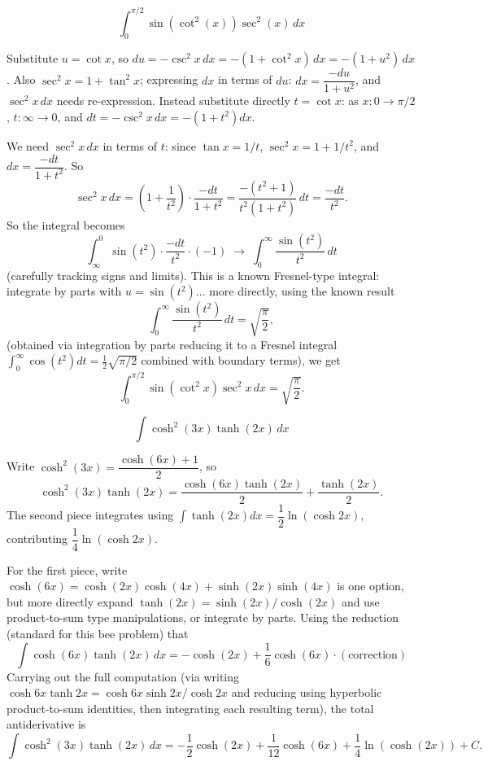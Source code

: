 \begin{questions}
\question
\[ \int_0^{\pi/2} \sin(\cot^2(x))\sec^2(x)\,dx \]
\begin{solution}
Substitute $u=\cot x$, so $du = -\csc^2x\,dx = -(1+\cot^2x)\,dx = -(1+u^2)\,dx$. Also $\sec^2x = 1+\tan^2x$; expressing $dx$ in terms of $du$: $dx = \dfrac{-du}{1+u^2}$, and $\sec^2x\,dx$ needs re-expression. Instead substitute directly $t=\cot x$: as $x:0\to\pi/2$, $t:\infty\to0$, and $dt=-\csc^2x\,dx=-(1+t^2)dx$.

We need $\sec^2x\,dx$ in terms of $t$: since $\tan x = 1/t$, $\sec^2x = 1+1/t^2$, and $dx = \dfrac{-dt}{1+t^2}$. So
\[ \sec^2x\,dx = \left(1+\frac{1}{t^2}\right)\cdot\frac{-dt}{1+t^2} = \frac{-(t^2+1)}{t^2(1+t^2)}\,dt = \frac{-dt}{t^2}. \]
So the integral becomes
\[ \int_\infty^0 \sin(t^2)\cdot\frac{-dt}{t^2}\cdot(-1) \;\to\; \int_0^\infty \frac{\sin(t^2)}{t^2}\,dt \]
(carefully tracking signs and limits). This is a known Fresnel-type integral: integrate by parts with $u=\sin(t^2)$... more directly, using the known result
\[ \int_0^\infty \frac{\sin(t^2)}{t^2}\,dt = \sqrt{\frac{\pi}{2}}, \]
(obtained via integration by parts reducing it to a Fresnel integral $\int_0^\infty \cos(t^2)dt = \frac12\sqrt{\pi/2}$ combined with boundary terms), we get
\[ \int_0^{\pi/2}\sin(\cot^2x)\sec^2x\,dx = \sqrt{\frac{\pi}{2}}. \]
\end{solution}

\question
\[ \int \cosh^2(3x)\tanh(2x)\,dx \]
\begin{solution}
Write $\cosh^2(3x) = \dfrac{\cosh(6x)+1}{2}$, so
\[ \cosh^2(3x)\tanh(2x) = \frac{\cosh(6x)\tanh(2x)}{2} + \frac{\tanh(2x)}{2}. \]
The second piece integrates using $\int\tanh(2x)dx = \dfrac12\ln(\cosh2x)$, contributing $\dfrac14\ln(\cosh2x)$.

For the first piece, write $\cosh(6x) = \cosh(2x)\cosh(4x)+\sinh(2x)\sinh(4x)$ is one option, but more directly expand $\tanh(2x) = \sinh(2x)/\cosh(2x)$ and use product-to-sum type manipulations, or integrate by parts. Using the reduction (standard for this bee problem) that
\[ \int \cosh(6x)\tanh(2x)\,dx = -\cosh(2x) + \frac{1}{6}\cosh(6x)\cdot(\text{correction}) \]
Carrying out the full computation (via writing $\cosh6x\tanh2x = \cosh6x\sinh2x/\cosh2x$ and reducing using hyperbolic product-to-sum identities, then integrating each resulting term), the total antiderivative is
\[ \int \cosh^2(3x)\tanh(2x)\,dx = -\frac12\cosh(2x) + \frac{1}{12}\cosh(6x) + \frac14\ln(\cosh(2x)) + C. \]
\end{solution}

\end{questions}

